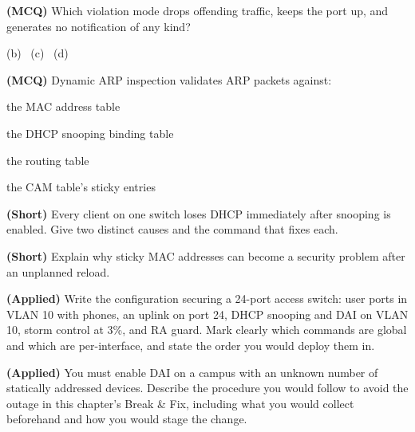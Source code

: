 \begin{reviewq}
  \item \textbf{(MCQ)} Which violation mode drops offending traffic, keeps the
        port up, and generates no notification of any kind?
        \begin{tight}
          \item[(a)]  \quad (b)~
          \quad (c)~ \quad (d)~
        \end{tight}
  \item \textbf{(MCQ)} Dynamic ARP inspection validates ARP packets against:
        \begin{tight}
          \item[(a)] the MAC address table
          \item[(b)] the DHCP snooping binding table
          \item[(c)] the routing table
          \item[(d)] the CAM table's sticky entries
        \end{tight}
  \item \textbf{(Short)} Every client on one switch loses DHCP immediately after
        snooping is enabled. Give two distinct causes and the command that fixes
        each.
  \item \textbf{(Short)} Explain why sticky MAC addresses can become a security
        problem after an unplanned reload.
  \item \textbf{(Applied)} Write the configuration securing a 24-port access
        switch: user ports in VLAN 10 with phones, an uplink on port 24, DHCP
        snooping and DAI on VLAN 10, storm control at 3\%, and RA guard. Mark
        clearly which commands are global and which are per-interface, and state
        the order you would deploy them in.
  \item \textbf{(Applied)} You must enable DAI on a campus with an unknown number
        of statically addressed devices. Describe the procedure you would follow
        to avoid the outage in this chapter's Break \& Fix, including what you
        would collect beforehand and how you would stage the change.
\end{reviewq}
